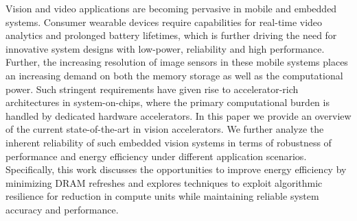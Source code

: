 Vision and video applications are becoming pervasive in mobile and embedded systems. 
Consumer wearable devices require capabilities for real-time video analytics 
and prolonged battery lifetimes, which is further driving 
the need for innovative system designs 
with low-power, reliability and high performance. 
Further, the increasing resolution of image sensors in these mobile systems places an increasing demand on 
both the memory storage as well as the computational power. 
Such stringent requirements have given rise to accelerator-rich architectures in system-on-chips, where the 
primary computational burden is handled by dedicated hardware accelerators. In this paper we provide an overview of the 
current state-of-the-art in vision accelerators.
We further analyze the inherent reliability of such embedded vision systems in terms of robustness of performance and energy 
efficiency under different application scenarios. Specifically, this work discusses the opportunities to improve energy efficiency 
by minimizing DRAM refreshes and explores techniques to exploit algorithmic resilience for reduction in compute units
while maintaining reliable system accuracy and performance.

